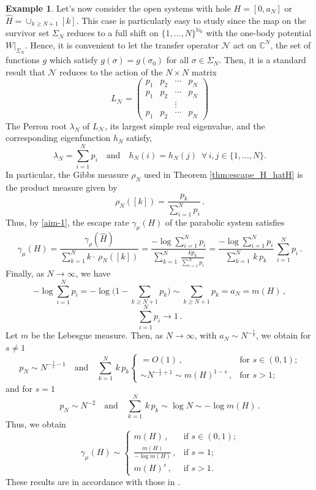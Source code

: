 \documentclass{amsart}
\theoremstyle{definition}
\theoremstyle{remark}
\theoremstyle{definition}
\newtheorem{example}[theorem]{Example}
\numberwithin{equation}{section}
\newcommand{\N}{\mathbb N}
\newcommand{\C}{\mathbb C}
\newcommand{\CN}{{\mathcal N}}
\begin{document}
\begin{example}
Let's now consider the open systems with hole $H=[0,a_N]$ or $\hat{H} = \cup_{k\ge N+1} [k]$. This case is particularly easy to study since the map on the survivor set $\Sigma_N$ reduces to a full shift on $\{1,\dots,N\}^{\N_0}$ with the one-body potential $W|_{\Sigma_N}$. Hence, it is convenient to let the transfer operator $\CN$ act on $\C^N$, the set of functions $g$ which satisfy $g(\sigma) = g(\sigma_0)$ for all $\sigma\in \Sigma_N$. Then, it is a standard result that $\CN$ reduces to the action of the $N\times N$ matrix 
\[
L_{\CN}= \begin{pmatrix}
    p_{1} & p_{2} &\cdots &p_{N}\\
    p_{1} & p_{2} &\cdots &p_{N}\\
          &       & \vdots &  \\
    p_{1} & p_{2} &\cdots &p_{N}
\end{pmatrix}
\]
The Perron root $\lambda_{N}$ of $L_{\CN}$, its largest simple real eigenvalue, and the corresponding eigenfunction $h_{N}$ satisfy,
\[ 
\lambda_{N} = \sum_{i=1}^{N} p_{i} \quad \text{and} \quad h_{N}(i) = h_{N}(j)\, \, \, \forall\, i,j \in \{1,\dots,N\}.
\]
In particular, the Gibbs measure $\rho_N$ used in Theorem \ref{thm:escape_H_hatH} is the product measure given by 
\[
\rho_N([k]) = \frac{p_k}{\sum_{i=1}^{N} p_i}\, .
\]
Thus, by \eqref{aim-1}, the escape rate $\gamma_\mu(H)$ of the parabolic system satisfies
\[
\gamma_\mu(H) = \frac{\gamma_\rho(\hat{H})}{\sum\limits_{k=1}^{N} k \cdot \, \rho_{N}([k])} = \frac{ -\log \sum_{i=1}^{N} p_i}{\sum\limits_{k=1}^N\, \frac{kp_k}{\sum_{i=1}^{N} p_i}} = \frac{ -\log \sum_{i=1}^{N} p_i}{\sum\limits_{k=1}^N\, k\, p_k}\, \sum_{i=1}^{N} p_i \, .
\]
Finally, as $N\to \infty$, we have 
\[
-\log \sum_{i=1}^{N} p_i = -\log \Big(1-\sum_{k\ge N+1} p_k\Big) \sim \sum_{k\ge N+1} p_k = a_N = m(H)\, ,
\]
\[
\sum_{i=1}^{N} p_i \to 1\, .
\]
Let $m$ be the Lebesgue measure. Then, as $N\to \infty$, with $a_N \sim N^{-\frac 1s}$, we obtain for $s\not= 1$
\[
p_N \sim N^{-\frac 1s-1} \quad \text{and} \quad \sum\limits_{k=1}^N\, k\, p_k  \left\{ \begin{array}{ll}
= O(1)\, , & \text{for $s\in (0,1)$;}\\[0.2cm] \sim N^{-\frac 1s+1} \sim m(H)^{1-s}\, , & \text{for $s>1$;} \end{array} \right.
\]
and for $s=1$
\[
p_N \sim N^{-2} \quad \text{and} \quad \sum\limits_{k=1}^N\, k\, p_k \sim \log N \sim -\log m(H)\, .
\]
Thus, we obtain
\[
\gamma_\mu(H) \sim \left\{ \begin{array}{ll} m(H)\, , & \text{if $s\in (0,1)$;}\\[0.2cm] \frac{m(H)}{-\log m(H)}\, , & \text{if $s=1$;}\\[0.2cm] m(H)^s\, , & \text{if $s>1$.} \end{array} \right.
\]
These results are in accordance with those in \cite{MK}.
\end{example}
\end{document}
